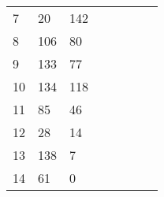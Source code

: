 \begin{table}[tb]
\begin{tabular}{|l|l|l|lllll}
	7  & 20  & 142 &                          &                         &                         &                          &                         \\ \cline{1-3}
	8  & 106 & 80  &                          &                         &                         &                          &                         \\ \cline{1-3}
	9  & 133 & 77  &                          &                         &                         &                          &                         \\ \cline{1-3}
	10 & 134 & 118 &                          &                         &                         &                          &                         \\ \cline{1-3}
	11 & 85  & 46  &                          &                         &                         &                          &                         \\ \cline{1-3}
	12 & 28  & 14  &                          &                         &                         &                          &                         \\ \cline{1-3}
	13 & 138 & 7   &                          &                         &                         &                          &                         \\ \cline{1-3}
	14 & 61  & 0   &                          &                         &                         &                          &                         \\ \cline{1-3}
\end{tabular}
	
	
	
	
\end{table}



